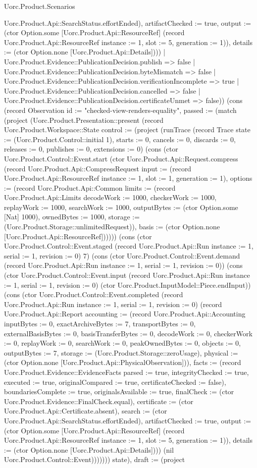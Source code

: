 \begin{lexlean}{Uorc.Product.Scenarios}
\begin{semanticmodule}
{{Uorc.Product.Api::SearchStatus.effortEnded), artifactChecked := true, output := (ctor Option.some [Uorc.Product.Api::ResourceRef] (record Uorc.Product.Api::ResourceRef {instance := 1, slot := 5, generation := 1})), details := (ctor Option.none [Uorc.Product.Api::Details])}))
    | Uorc.Product.Evidence::PublicationDecision.publish => false
    | Uorc.Product.Evidence::PublicationDecision.byteMismatch => false
    | Uorc.Product.Evidence::PublicationDecision.verificationIncomplete => true
    | Uorc.Product.Evidence::PublicationDecision.cancelled => false
    | Uorc.Product.Evidence::PublicationDecision.certificateUnmet => false)}) (cons (record Observation {id := "checked-view-renders-equality", passed := (match (project (Uorc.Product.Presentation::present (record Uorc.Product.Workspace::State {control := (project (runTrace (record Trace {state := (Uorc.Product.Control::initial 1), starts := 0, cancels := 0, discards := 0, releases := 0, publishes := 0, extensions := 0}) (cons (ctor Uorc.Product.Control::Event.start (ctor Uorc.Product.Api::Request.compress (record Uorc.Product.Api::CompressRequest {input := (record Uorc.Product.Api::ResourceRef {instance := 1, slot := 1, generation := 1}), options := (record Uorc.Product.Api::Common {limits := (record Uorc.Product.Api::Limits {decodeWork := 1000, checkerWork := 1000, replayWork := 1000, searchWork := 1000, outputBytes := (ctor Option.some [Nat] 1000), ownedBytes := 1000, storage := (Uorc.Product.Storage::unlimitedRequest)}), basis := (ctor Option.none [Uorc.Product.Api::ResourceRef])})}))) (cons (ctor Uorc.Product.Control::Event.staged (record Uorc.Product.Api::Run {instance := 1, serial := 1, revision := 0}) 7) (cons (ctor Uorc.Product.Control::Event.demand (record Uorc.Product.Api::Run {instance := 1, serial := 1, revision := 0})) (cons (ctor Uorc.Product.Control::Event.input (record Uorc.Product.Api::Run {instance := 1, serial := 1, revision := 0}) (ctor Uorc.Product.InputModel::Piece.endInput)) (cons (ctor Uorc.Product.Control::Event.completed (record Uorc.Product.Api::Run {instance := 1, serial := 1, revision := 0}) (record Uorc.Product.Api::Report {accounting := (record Uorc.Product.Api::Accounting {inputBytes := 0, exactArchiveBytes := 7, transportBytes := 0, externalBasisBytes := 0, basisTransferBytes := 0, decodeWork := 0, checkerWork := 0, replayWork := 0, searchWork := 0, peakOwnedBytes := 0, objects := 0, outputBytes := 7, storage := (Uorc.Product.Storage::zeroUsage), physical := (ctor Option.none [Uorc.Product.Api::PhysicalObservation])}), facts := (record Uorc.Product.Evidence::EvidenceFacts {parsed := true, integrityChecked := true, executed := true, originalCompared := true, certificateChecked := false}), boundariesComplete := true, originalsAvailable := true, finalCheck := (ctor Uorc.Product.Evidence::FinalCheck.equal), certificate := (ctor Uorc.Product.Api::Certificate.absent), search := (ctor Uorc.Product.Api::SearchStatus.effortEnded), artifactChecked := true, output := (ctor Option.some [Uorc.Product.Api::ResourceRef] (record Uorc.Product.Api::ResourceRef {instance := 1, slot := 5, generation := 1})), details := (ctor Option.none [Uorc.Product.Api::Details])})) (nil Uorc.Product.Control::Event))))))) state), draft := (project }}
\end{semanticmodule}
\end{lexlean}
